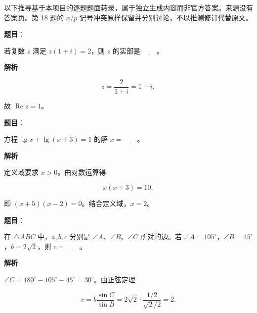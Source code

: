 

\begin{gktip}
以下推导基于本项目的逐题题面转录，属于独立生成内容而非官方答案。来源没有答案页。第 18 题的 $x/p$ 记号冲突原样保留并分别讨论，不以推测修订代替原文。
\end{gktip}

\begin{answer}

\textbf{题目}：

若复数 $z$ 满足 $z(1+i)=2$，则 $z$ 的实部是 $\underline{\qquad}$。

\textbf{解析}

\nopagebreak[4]
\[z=\frac2{1+i}=1-i,\]

故 $\operatorname{Re}z=1$。


\end{answer}
\begin{answer}

\textbf{题目}：

方程 $\lg x+\lg(x+3)=1$ 的解 $x=\underline{\qquad}$。

\textbf{解析}

定义域要求 $x>0$。由对数运算得

\nopagebreak[4]
\[x(x+3)=10,\]

即 $(x+5)(x-2)=0$。结合定义域，$x=2$。


\end{answer}
\begin{answer}

\textbf{题目}：

在 $\triangle ABC$ 中，$a,b,c$ 分别是 $\angle A$、$\angle B$、$\angle C$ 所对的边。若 $\angle A=105^\circ$，$\angle B=45^\circ$，$b=2\sqrt{2}$，则 $c=\underline{\qquad}$。

\textbf{解析}

$\angle C=180^\circ-105^\circ-45^\circ=30^\circ$。由正弦定理

\nopagebreak[4]
\[c=b\frac{\sin C}{\sin B}=2\sqrt2\cdot\frac{1/2}{\sqrt2/2}=2.\]


\end{answer}
